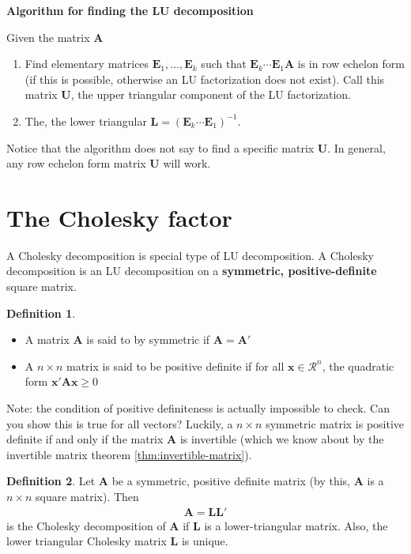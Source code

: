 \documentclass[
]{book}
\theoremstyle{definition}
\newtheorem{definition}{Definition}[chapter]
\theoremstyle{definition}
\theoremstyle{definition}
\theoremstyle{definition}
\theoremstyle{remark}
\begin{document}
\textbf{Algorithm for finding the LU decomposition}

Given the matrix \(\mathbf{A}\)

\begin{enumerate}
\def\labelenumi{\arabic{enumi})}
\item
  Find elementary matrices \(\mathbf{E}_1, \ldots, \mathbf{E}_k\) such that \(\mathbf{E}_k \cdots \mathbf{E}_1 \mathbf{A}\) is in row echelon form (if this is possible, otherwise an LU factorization does not exist). Call this matrix \(\mathbf{U}\), the upper triangular component of the LU factorization.
\item
  The, the lower triangular \(\mathbf{L} = (\mathbf{E}_k \cdots \mathbf{E}_1)^{-1}\).
\end{enumerate}

Notice that the algorithm does not say to find a specific matrix \(\mathbf{U}\). In general, any row echelon form matrix \(\mathbf{U}\) will work.

\hypertarget{the-cholesky-factor}{%
\section{The Cholesky factor}\label{the-cholesky-factor}}

A Cholesky decomposition is special type of LU decomposition. A Cholesky decomposition is an LU decomposition on a \textbf{symmetric, positive-definite} square matrix.

\begin{definition}

\begin{itemize}
\item
  A matrix \(\mathbf{A}\) is said to by symmetric if \(\mathbf{A} = \mathbf{A}'\)
\item
  A \(n \times n\) matrix is said to be positive definite if for all \(\mathbf{x} \in \mathcal{R}^n\), the quadratic form \(\mathbf{x}' \mathbf{A }\mathbf{x} \geq 0\)
\end{itemize}

\end{definition}

Note: the condition of positive definiteness is actually impossible to check. Can you show this is true for all vectors? Luckily, a \(n \times n\) symmetric matrix is positive definite if and only if the matrix \(\mathbf{A}\) is invertible (which we know about by the invertible matrix theorem \ref{thm:invertible-matrix}).

\begin{definition}
Let \(\mathbf{A}\) be a symmetric, positive definite matrix (by this, \(\mathbf{A}\) is a \(n \times n\) square matrix). Then
\[
\begin{aligned}
\mathbf{A} = \mathbf{L} \mathbf{L}'
\end{aligned}
\]
is the Cholesky decomposition of \(\mathbf{A}\) if \(\mathbf{L}\) is a lower-triangular matrix. Also, the lower triangular Cholesky matrix \(\mathbf{L}\) is unique.
\end{definition}
\end{document}
